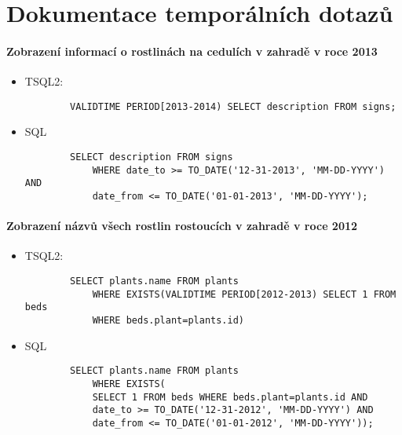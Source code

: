 \documentclass[12pt,a4paper]{article}
\begin{document}
\section*{Dokumentace temporálních dotazů}

\paragraph*{Zobrazení informací o rostlinách na cedulích v zahradě v roce 2013}
\begin{itemize}

    \item
    TSQL2:
        \begin{verbatim}
        VALIDTIME PERIOD[2013-2014) SELECT description FROM signs;
        \end{verbatim}
    \item
    SQL
        \begin{verbatim}
        SELECT description FROM signs
            WHERE date_to >= TO_DATE('12-31-2013', 'MM-DD-YYYY') AND
            date_from <= TO_DATE('01-01-2013', 'MM-DD-YYYY');
        \end{verbatim}

\end{itemize}

\paragraph*{Zobrazení názvů všech rostlin rostoucích v zahradě v roce 2012}
\begin{itemize}

    \item
    TSQL2:
        \begin{verbatim}
        SELECT plants.name FROM plants
            WHERE EXISTS(VALIDTIME PERIOD[2012-2013) SELECT 1 FROM beds
            WHERE beds.plant=plants.id)
        \end{verbatim}
    \item
    SQL
        \begin{verbatim}
        SELECT plants.name FROM plants
            WHERE EXISTS(
            SELECT 1 FROM beds WHERE beds.plant=plants.id AND
            date_to >= TO_DATE('12-31-2012', 'MM-DD-YYYY') AND
            date_from <= TO_DATE('01-01-2012', 'MM-DD-YYYY'));
        \end{verbatim}

\end{itemize}
\end{document}
